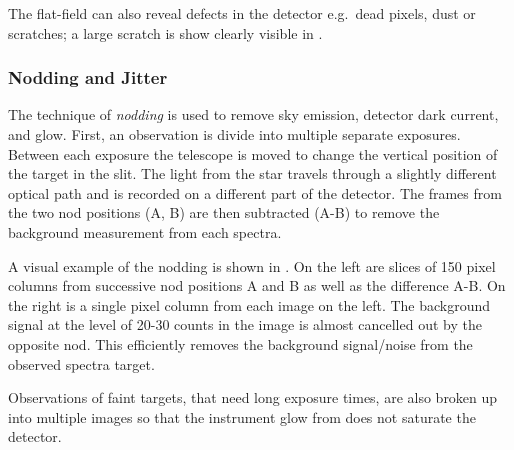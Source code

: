 The flat-field can also reveal defects in the detector e.g.\ dead pixels, dust or scratches; a large scratch is show clearly visible in .

\subsubsection{Nodding and Jitter}
\label{subsec:nod-jitter}
The technique of \emph{nodding} is used to remove sky emission, detector dark current, and glow.
First, an observation is divide into multiple separate exposures.
Between each exposure the telescope is moved to change the vertical position of the target in the slit.
The light from the star travels through a slightly different optical path and is recorded on a different part of the detector.
The frames from the two nod positions (A, B) are then subtracted (A-B) to remove the background measurement from each spectra.

A visual example of the nodding is shown in .
On the left are slices of 150 pixel columns from successive nod positions A and B as well as the difference A-B.
On the right is a single pixel column from each image on the left.
The background signal at the level of 20-30 counts in the image is almost cancelled out by the opposite nod.
This efficiently removes the background signal/noise from the observed spectra target.

Observations of faint targets, that need long exposure times, are also broken up into multiple images so that the instrument glow from  does not saturate the detector.


